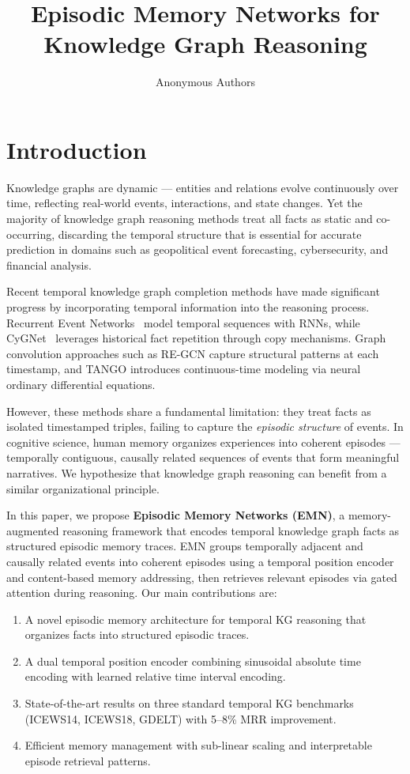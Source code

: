 \documentclass{article}
\title{Episodic Memory Networks for Knowledge Graph Reasoning}
\author{Anonymous Authors}
\begin{document}
\maketitle

\begin{abstract}
\end{abstract}

\section{Introduction}
\label{sec:intro}

Knowledge graphs are dynamic --- entities and relations evolve continuously over time, reflecting real-world events, interactions, and state changes. Yet the majority of knowledge graph reasoning methods treat all facts as static and co-occurring, discarding the temporal structure that is essential for accurate prediction in domains such as geopolitical event forecasting, cybersecurity, and financial analysis.

Recent temporal knowledge graph completion methods have made significant progress by incorporating temporal information into the reasoning process. Recurrent Event Networks~\citep{jin2020renet} model temporal sequences with RNNs, while CyGNet~\citep{zhu2021cygnet} leverages historical fact repetition through copy mechanisms. Graph convolution approaches such as RE-GCN capture structural patterns at each timestamp, and TANGO introduces continuous-time modeling via neural ordinary differential equations.

However, these methods share a fundamental limitation: they treat facts as isolated timestamped triples, failing to capture the \emph{episodic structure} of events. In cognitive science, human memory organizes experiences into coherent episodes --- temporally contiguous, causally related sequences of events that form meaningful narratives. We hypothesize that knowledge graph reasoning can benefit from a similar organizational principle.

In this paper, we propose \textbf{Episodic Memory Networks (EMN)}, a memory-augmented reasoning framework that encodes temporal knowledge graph facts as structured episodic memory traces. EMN groups temporally adjacent and causally related events into coherent episodes using a temporal position encoder and content-based memory addressing, then retrieves relevant episodes via gated attention during reasoning. Our main contributions are:
\begin{enumerate}
\item A novel episodic memory architecture for temporal KG reasoning that organizes facts into structured episodic traces.
\item A dual temporal position encoder combining sinusoidal absolute time encoding with learned relative time interval encoding.
\item State-of-the-art results on three standard temporal KG benchmarks (ICEWS14, ICEWS18, GDELT) with 5--8\% MRR improvement.
\item Efficient memory management with sub-linear scaling and interpretable episode retrieval patterns.
\end{enumerate}
\end{document}
